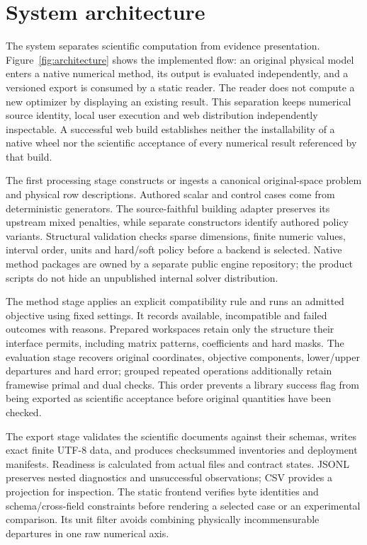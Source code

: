 \section{System architecture}\label{sec:architecture}
The system separates scientific computation from evidence presentation.
Figure~\ref{fig:architecture} shows the implemented flow: an original physical
model enters a native numerical method, its output is evaluated independently,
and a versioned export is consumed by a static reader. The reader does not
compute a new optimizer by displaying an existing result. This separation
keeps numerical source identity, local user execution and web distribution
independently inspectable. A successful web build establishes neither the
installability of a native wheel nor the scientific acceptance of every
numerical result referenced by that build.


The first processing stage constructs or ingests a canonical original-space
problem and physical row descriptions. Authored scalar and control cases
come from deterministic generators. The source-faithful building adapter
preserves its upstream mixed penalties, while separate constructors identify
authored policy variants. Structural validation checks sparse dimensions,
finite numeric values, interval order, units and hard/soft policy before a
backend is selected. Native method packages are owned by a separate public
engine repository; the product scripts do not hide an unpublished internal
solver distribution.

The method stage applies an explicit compatibility rule and runs an admitted
objective using fixed settings. It records available, incompatible and failed
outcomes with reasons. Prepared workspaces retain only the structure their
interface permits, including matrix patterns, coefficients and hard masks.
The evaluation stage recovers original coordinates, objective components,
lower/upper departures and hard error; grouped repeated operations additionally
retain framewise primal and dual checks. This order prevents a library success
flag from being exported as scientific acceptance before original quantities
have been checked.

The export stage validates the scientific documents against their schemas,
writes exact finite UTF-8 data, and produces checksummed inventories and
deployment manifests. Readiness is calculated from actual files and contract
states. JSONL preserves nested diagnostics and unsuccessful observations;
CSV provides a projection for inspection. The static frontend verifies byte
identities and schema/cross-field constraints before rendering a selected case
or an experimental comparison. Its unit filter avoids combining physically
incommensurable departures in one raw numerical axis.

